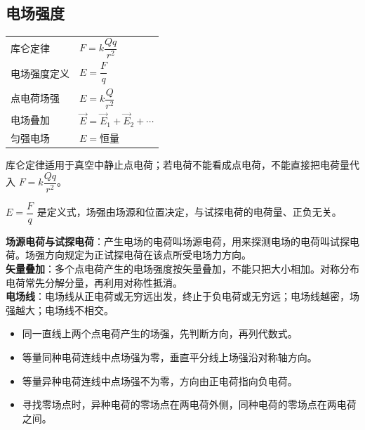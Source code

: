 
\subsection{电场强度}

\begin{tabularx}{\columnwidth}{XX}
  库仑定律&$F=k\dfrac{Qq}{r^2}$\\
  电场强度定义&$E=\dfrac{F}{q}$\\
  点电荷场强&$E=k\dfrac{Q}{r^2}$\\
  电场叠加&$\vec E=\vec E_1+\vec E_2+\cdots$\\
  匀强电场&$E=\text{恒量}$\\
\end{tabularx}

\begin{formulanotebox}
库仑定律适用于真空中静止点电荷；若电荷不能看成点电荷，不能直接把电荷量代入 $F=k\dfrac{Qq}{r^2}$。

$E=\dfrac{F}{q}$ 是定义式，场强由场源和位置决定，与试探电荷的电荷量、正负无关。
\end{formulanotebox}

\begin{keypointbox}[title={\strut\textcolor{white}{\bfseries 重点知识点：电场强度}}]
\textbf{场源电荷与试探电荷}：产生电场的电荷叫场源电荷，用来探测电场的电荷叫试探电荷。场强方向规定为正试探电荷在该点所受电场力方向。\\

\textbf{矢量叠加}：多个点电荷产生的电场强度按矢量叠加，不能只把大小相加。对称分布电荷常先分解分量，再利用对称性抵消。\\

\textbf{电场线}：电场线从正电荷或无穷远出发，终止于负电荷或无穷远；电场线越密，场强越大；电场线不相交。
\end{keypointbox}

\begin{casetypebox}[title={\strut\textcolor{white}{\bfseries 常见题型：场强叠加与零场点}}]
\begin{itemize}[leftmargin=1.5em]
  \item 同一直线上两个点电荷产生的场强，先判断方向，再列代数式。
  \item 等量同种电荷连线中点场强为零，垂直平分线上场强沿对称轴方向。
  \item 等量异种电荷连线中点场强不为零，方向由正电荷指向负电荷。
  \item 寻找零场点时，异种电荷的零场点在两电荷外侧，同种电荷的零场点在两电荷之间。
\end{itemize}
\end{casetypebox}
